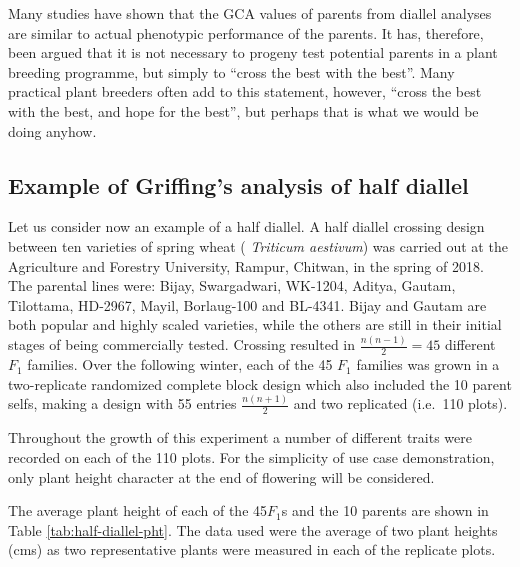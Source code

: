 \documentclass[nofonts,]{tufte-handout}
\begin{document}
Many studies have shown that the GCA values of parents from diallel
analyses are similar to actual phenotypic performance of the parents. It
has, therefore, been argued that it is not necessary to progeny test
potential parents in a plant breeding programme, but simply to ``cross
the best with the best''. Many practical plant breeders often add to
this statement, however, ``cross the best with the best, and hope for
the best'', but perhaps that is what we would be doing anyhow.

\hypertarget{example-of-griffings-analysis-of-half-diallel}{%
\subsection{Example of Griffing's analysis of half
diallel}\label{example-of-griffings-analysis-of-half-diallel}}

Let us consider now an example of a half diallel. A half diallel
crossing design between ten varieties of spring wheat ( \emph{Triticum
aestivum}) was carried out at the Agriculture and Forestry University,
Rampur, Chitwan, in the spring of 2018. The parental lines were: Bijay,
Swargadwari, WK-1204, Aditya, Gautam, Tilottama, HD-2967, Mayil,
Borlaug-100 and BL-4341. Bijay and Gautam are both popular and highly
scaled varieties, while the others are still in their initial stages of
being commercially tested. Crossing resulted in
\(\frac{n(n-1)}{2} = 45\) different \(F_1\) families. Over the following
winter, each of the 45 \(F_1\) families was grown in a two-replicate
randomized complete block design which also included the 10 parent
selfs, making a design with 55 entries \(\frac{n(n+1)}{2}\) and two
replicated (i.e.~110 plots).

Throughout the growth of this experiment a number of different traits
were recorded on each of the 110 plots. For the simplicity of use case
demonstration, only plant height character at the end of flowering will
be considered.

The average plant height of each of the 45\(F_1\)s and the 10 parents
are shown in Table \ref{tab:half-diallel-pht}. The data used were the
average of two plant heights (cms) as two representative plants were
measured in each of the replicate plots.
\end{document}
